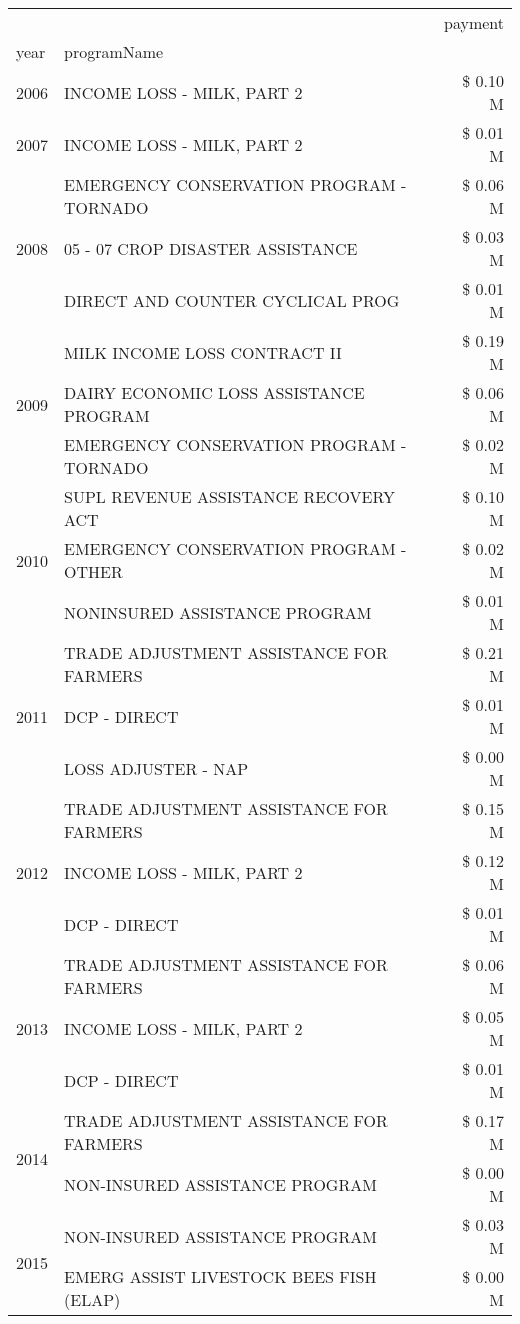 \begin{tabular}{llr}
\toprule
 &  & payment \\
year & programName &  \\
\midrule
2006 & INCOME LOSS - MILK, PART 2 & \$ 0.10 M \\
\cline{1-3}
2007 & INCOME LOSS - MILK, PART 2 & \$ 0.01 M \\
\cline{1-3}
\multirow[t]{3}{*}{2008} & EMERGENCY CONSERVATION PROGRAM - TORNADO & \$ 0.06 M \\
 & 05 - 07 CROP DISASTER ASSISTANCE & \$ 0.03 M \\
 & DIRECT AND COUNTER CYCLICAL PROG & \$ 0.01 M \\
\cline{1-3}
\multirow[t]{3}{*}{2009} & MILK INCOME LOSS CONTRACT II & \$ 0.19 M \\
 & DAIRY ECONOMIC LOSS ASSISTANCE PROGRAM & \$ 0.06 M \\
 & EMERGENCY CONSERVATION PROGRAM - TORNADO & \$ 0.02 M \\
\cline{1-3}
\multirow[t]{3}{*}{2010} & SUPL REVENUE ASSISTANCE RECOVERY ACT & \$ 0.10 M \\
 & EMERGENCY CONSERVATION PROGRAM - OTHER & \$ 0.02 M \\
 & NONINSURED ASSISTANCE PROGRAM & \$ 0.01 M \\
\cline{1-3}
\multirow[t]{3}{*}{2011} & TRADE ADJUSTMENT ASSISTANCE FOR FARMERS & \$ 0.21 M \\
 & DCP - DIRECT & \$ 0.01 M \\
 & LOSS ADJUSTER - NAP & \$ 0.00 M \\
\cline{1-3}
\multirow[t]{3}{*}{2012} & TRADE ADJUSTMENT ASSISTANCE FOR FARMERS & \$ 0.15 M \\
 & INCOME LOSS - MILK, PART 2 & \$ 0.12 M \\
 & DCP - DIRECT & \$ 0.01 M \\
\cline{1-3}
\multirow[t]{3}{*}{2013} & TRADE ADJUSTMENT ASSISTANCE FOR FARMERS & \$ 0.06 M \\
 & INCOME LOSS - MILK, PART 2 & \$ 0.05 M \\
 & DCP - DIRECT & \$ 0.01 M \\
\cline{1-3}
\multirow[t]{2}{*}{2014} & TRADE ADJUSTMENT ASSISTANCE FOR FARMERS & \$ 0.17 M \\
 & NON-INSURED ASSISTANCE PROGRAM & \$ 0.00 M \\
\cline{1-3}
\multirow[t]{2}{*}{2015} & NON-INSURED ASSISTANCE PROGRAM & \$ 0.03 M \\
 & EMERG ASSIST LIVESTOCK BEES FISH (ELAP) & \$ 0.00 M \\

\end{tabular}
